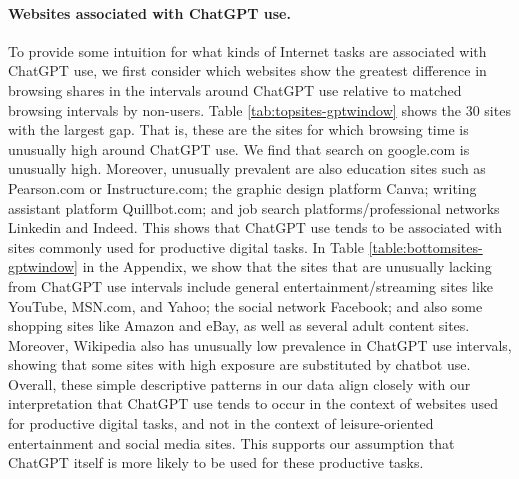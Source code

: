 \documentclass[12pt]{article}
\begin{document}
\paragraph{Websites associated with ChatGPT use.} To provide some intuition for what kinds of Internet tasks are associated with ChatGPT use, we first consider which websites show the greatest  difference in browsing shares in the intervals around ChatGPT use relative to matched browsing intervals by non-users. Table \ref{tab:topsites-gptwindow} shows the 30 sites with the largest gap. That is, these are the sites for which browsing time is unusually high around ChatGPT use. We find that search on google.com is  unusually high. Moreover, unusually prevalent are also education sites such as Pearson.com or Instructure.com; the graphic design platform Canva; writing assistant platform Quillbot.com; and job search platforms/professional networks Linkedin and Indeed. This shows that ChatGPT use tends to be associated with sites commonly used for productive digital tasks. In Table \ref{table:bottomsites-gptwindow} in the Appendix, we show that the sites that are unusually lacking from ChatGPT use intervals include general entertainment/streaming sites like YouTube, MSN.com, and Yahoo; the social network Facebook; and also some shopping sites like Amazon and eBay, as well as several adult content sites. Moreover, Wikipedia also has unusually low prevalence in ChatGPT use intervals, showing that some sites with high exposure are substituted by chatbot use. Overall, these simple descriptive patterns in our data align closely with our interpretation that ChatGPT use tends to occur in the context of websites used for productive digital tasks, and not in the context of leisure-oriented entertainment and social media sites. This supports our assumption that ChatGPT itself is more likely to be used for these productive tasks.
\end{document}
